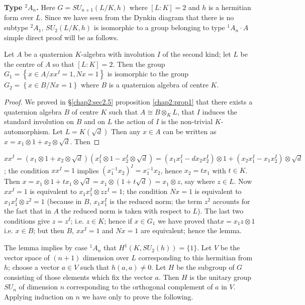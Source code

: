 \medskip
\noindent
{\bf Type {\boldmath${}^2A_n$}.} Here $G= SU_{n+1}(L/K,h)$ where
$[L:K] =2$ and $h$ 
is a hermitian form over $L$. Since we have seen from the Dynkin
diagram that there is no subtype ${}^2 A_1$, $SU_2(L/K,h)$ is
isomorphic to a group belonging to type ${}^1 A_n\cdot A$ simple
direct proof will be as follows. 

\begin{lem}%
Let $A$ be a quaternion $K$-algebra with involution $I$ of the second
kind; let $L$ be the centre of $A$ so that $[L : K]= 2$. Then the
group $G_1 = \left\{ x \in A/xx^I = 1, Nx =1 \right\}$ is isomorphic
to the group $G_2 = \left\{ x \in B/Nx = 1 \right\}$ where $B$ is a
quaternion algebra of centre $K$. 
 \end{lem} 

 \begin{proof}
We proved in \S \ref{chap2:sec2.5} proposition \ref{chap2:prop1}
that there exists a quaternion 
algebra $B$ of centre $K$ such that $A \cong B \otimes_K L$, that $I$
induces the standard involution on $B$ and on $L$ the action of $I$ is
the non-trivial $K$-automorphism. Let $L= K (\sqrt{d})$ Then any $x \in
A$ can be written as $x = x_1 \otimes 1 + x_2 \otimes \sqrt{d}$. Then  
\end{proof} 

\noindent
$xx^I = (x_1 \otimes 1 + x_2 \otimes \sqrt{d}) (x^I_1 \otimes 1 -
 x^I_2 \otimes \sqrt{d}) = ( x_1 x^I_1 - dx_2 x^I_2) \otimes 1 + (x_2
 x^I_1 - x_1 x^I_2) \otimes \sqrt{d}$; the condition $xx^I=1 $ implies
 $(x^{-1}_1 x_2)^I = x^{-1}_1 x_2$, hence $x_2 =tx_1$ with $t \in
 K$. Then $x = x_1 \otimes 1 + tx_1 \otimes \sqrt{d} = x_1 \otimes (1
 + t \sqrt{d}) = x_1 \otimes z$, say where $z \in L$. Now $xx^I = 1$
 is equivalent to $x_1 x^I_1 \otimes zz^I= 1$; the condition $Nx = 1$ is
 equivalent to $x_1 x^I_1 \otimes z^2 = 1$ (because in $B$, $x_1 x^I_1$
 is the reduced norm; the term $z^2$ accounts for the fact that in $A$
 the reduced norm is taken with respect to $L$). The last two
 conditions give $z = z^I$; i.e. $z \in K$; hence if $x \in G_1$ we have
 proved that\pageoriginale $x = x_1 z \otimes 1$ i.e. $x \in B$; but
 then $B$, $xx^I =1$ and $Nx= 1$ are equivalent; hence the lemma.  

The lemma implies by case ${}^1 A_n$ that $H^1(K,SU_2(h))=\{1\}$. 
Let $V$ be the vector space of $(n+1)$ dimension over $L$
corresponding to this hermitian from $h$; choose a vector $a \in V$
such that $h(a,a)\neq 0$. Let $H$ be the subgroup of $G$ consisting of
those elements which fix the vector $a$. Then $H$ is the unitary group
$SU_n$ of dimension $n$ corresponding to the orthogonal complement of
$a$ in $V$. Applying induction on $n$ we have only to prove the
following. 
 
